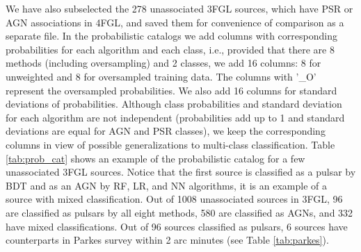 We have also subselected the 278 unassociated 3FGL sources, which have PSR or AGN associations in 4FGL,
and saved them for convenience of comparison as a separate file.
In the probabilistic catalogs we add columns with corresponding probabilities for each algorithm and each class,
i.e., provided that there are 8 methods (including oversampling) and 2 classes, we add 16 columns: 8 for unweighted and 8 for oversampled training data. The columns with '\_O' represent the oversampled probabilities. We also add 16 columns for standard deviations of probabilities. Although class probabilities and standard deviation for each algorithm are not independent (probabilities add up to 1 and standard deviations are equal for AGN and PSR classes), we keep the corresponding columns in view of possible generalizations to multi-class classification.
Table \ref{tab:prob_cat} shows an example of the probabilistic catalog for a few unassociated 3FGL sources.
Notice that the first source is classified as a pulsar by BDT and as an AGN by RF, LR, and NN algorithms,
it is an example of a source with mixed classification.
Out of 1008 unassociated sources in 3FGL, 96 are classified as pulsars by all eight methods, 580 are classified as AGNs, and 332 have mixed classifications.
Out of 96 sources classified as pulsars, 6 sources have counterparts in Parkes survey \citep{Camilo2015} within 2 arc minutes (see Table \ref{tab:parkes}).

